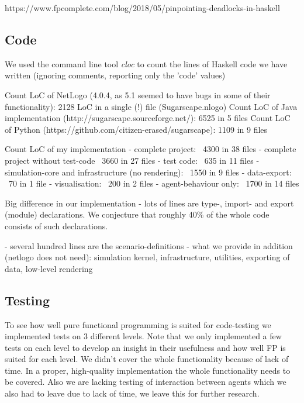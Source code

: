https://www.fpcomplete.com/blog/2018/05/pinpointing-deadlocks-in-haskell

\subsection{Code}
We used the command line tool \textit{cloc} to count the lines of Haskell code we have written (ignoring comments, reporting only the 'code' values)

Count LoC of NetLogo (4.0.4, as 5.1 seemed to have bugs in some of their functionality): 2128 LoC in a single (!) file (Sugarscape.nlogo)
Count LoC of Java implementation (http://sugarscape.sourceforge.net/): 6525 in 5 files
Count LoC of Python (https://github.com/citizen-erased/sugarscape): 1109 in 9 files

Count LoC of my implementation
- complete project: ~4300 in 38 files
- complete project without test-code ~3660 in 27 files
- test code: ~635 in 11 files
- simulation-core and infrastructure (no rendering): ~1550 in 9 files
- data-export: ~70 in 1 file
- visualisation: ~200 in 2 files
- agent-behaviour only: ~1700 in 14 files

Big difference in our implementation
- lots of lines are type-, import- and export (module) declarations. We conjecture that roughly 40\% of the whole code consists of such declarations.

- several hundred lines are the scenario-definitions
- what we provide in addition (netlogo does not need): simulation kernel, infrastructure, utilities, exporting of data, low-level rendering

\subsection{Testing}
To see how well pure functional programming is suited for code-testing we implemented tests on 3 different levels. Note that we only implemented a few tests on each level to develop an insight in their usefulness and how well FP is suited for each level. We didn't cover the whole functionality because of lack of time. In a proper, high-quality implementation the whole functionality needs to be covered. Also we are lacking testing of interaction between agents which we also had to leave due to lack of time, we leave this for further research.

